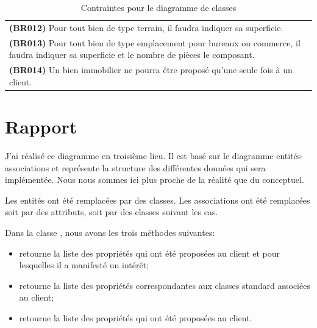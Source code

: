 \begin{table}
\begin{tabular}{|p{}|}
  \textbf{(BR012)} Pour tout bien de type \og{}terrain\fg{}, il faudra indiquer sa superficie. \\
  \textbf{(BR013)} Pour tout bien de type \og{}emplacement pour bureaux ou commerce\fg{}, il faudra indiquer sa superficie et le nombre de pièces le composant. \\
  \textbf{(BR014)} Un bien immobilier ne pourra être proposé qu'une seule fois à un client. \\
  \hline
  \end{tabular}
  \caption{Contraintes pour le diagramme de classes}
  \label{tbl_business_rules}
\end{table}


\section{Rapport}

J'ai réalisé ce diagramme en troisième lieu. Il est basé sur le diagramme entités-associations et représente la structure des différentes données qui sera implémentée. Nous nous sommes ici plus proche de la réalité que du conceptuel.

Les entités ont été remplacées par des classes. Les associations ont été remplacées soit par des attributs, soit par des classes suivant les cas.

Dans la classe , nous avons les trois méthodes suivantes:
\begin{itemize}
  \item {} retourne la liste des propriétés qui ont été proposées au client et pour lesquelles il a manifesté un intérêt;
  \item {} retourne la liste des propriétés correspondantes aux classes standard associées au client;
  \item {} retourne la liste des propriétés qui ont été proposées au client.
\end{itemize}